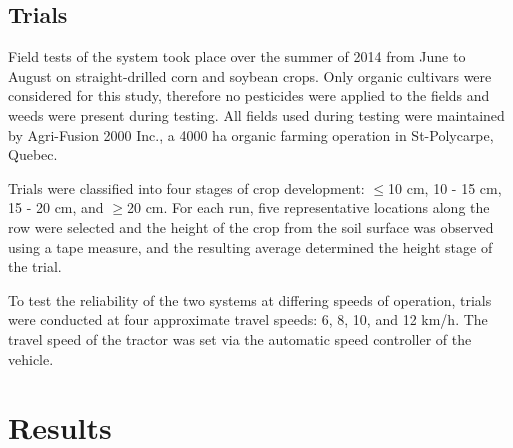 \begin{flushleft}
\begin{flushleft}
\subsection{Trials}
Field tests of the system took place over the summer of 2014 from June
to August on straight-drilled corn and soybean crops. Only organic
cultivars were considered for this study, therefore no pesticides were
applied to the fields and weeds were present during testing. All
fields used during testing were maintained by Agri-Fusion 2000 Inc., a
4000 ha organic farming operation in St-Polycarpe, Quebec. 

Trials were classified into four stages of crop development: $\le$10 cm,
10 - 15 cm, 15 - 20 cm, and $\ge$20 cm. For each run, five representative
locations along the row were selected and the height of the crop from
the soil surface was observed using a tape measure, and the resulting
average determined the height stage of the trial.

To test the reliability of the two systems at differing speeds of
operation, trials were conducted at four approximate travel speeds: 6,
8, 10, and 12 km/h. The travel speed of the tractor was set via the
automatic speed controller of the vehicle.

\section{Results}
\begin{table}[h]
  \centering
  \caption{RMSE and 95$^{th}$ Percentile
    with respect to crop-stage.} 
  \label{table:travel_speed}
\end{table}


\end{flushleft}
\end{flushleft}
